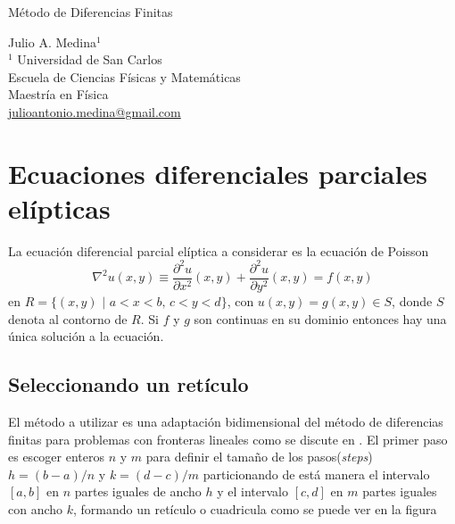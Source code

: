 \documentclass[a4paper]{article}
\begin{document}

\Large
 \begin{center}
Método de Diferencias Finitas\\


\hspace{10pt}

\large
Julio A. Medina$^1$ \\
\hspace{10pt}
\small  
$^1$ Universidad de San Carlos\\
Escuela de Ciencias Físicas y Matemáticas\\
Maestría en Física\\
\href{mailto:julioantonio.medina@gmail.com}{julioantonio.medina@gmail.com}\\

\end{center}

\hspace{10pt}

\normalsize
\section{Ecuaciones diferenciales parciales elípticas}
La ecuación diferencial parcial elíptica a considerar es la ecuación de Poisson
\begin{equation}\label{eq::Poisson}
\nabla^2 u(x,y)\equiv \frac{\partial^2 u}{\partial x^2}(x,y) + \frac{\partial^2 u}{\partial y^2}(x,y)=f(x,y)
\end{equation}
en $R=\{ (x,y)\,\,|\,\, a<x<b ,\, c<y<d \}$, con $u(x,y)=g(x,y) \in S$, donde $S$ denota al contorno de $R$. Si $f$ y $g$ son continuas en su dominio entonces hay una única solución a la ecuación.
\subsection{Seleccionando un retículo}
El método a utilizar es una adaptación bidimensional del método de diferencias finitas para problemas con fronteras lineales como se discute en \cite{Burden}. El primer paso es escoger enteros $n$ y $m$ para definir el tamaño de los pasos(\textit{steps}) $h=(b-a)/n$ y $k=(d-c)/m$ particionando de está manera el intervalo $[a,b]$ en $n$ partes iguales de ancho $h$ y el intervalo $[c,d]$ en $m$ partes iguales con ancho $k$, formando un retículo o cuadricula como se puede ver en la figura
\end{document}

